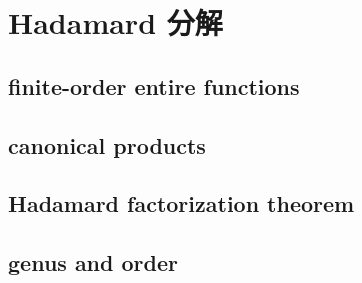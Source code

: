 \section{Hadamard 分解}
\label{b3:sec:2005}


\subsection{finite-order entire functions}
\label{b3:subsec:200501}

\subsection{canonical products}
\label{b3:subsec:200502}

\subsection{Hadamard factorization theorem}
\label{b3:subsec:200503}

\subsection{genus and order}
\label{b3:subsec:200504}



